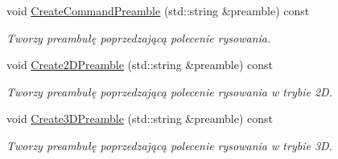 \begin{DoxyCompactItemize}
$$\item 
void \hyperlink{class_pz_g_1_1_gnuplot_link_a1d9ac939f5871ca51d283422327906ba}{Create\+Command\+Preamble} (std\+::string \&preamble) const 
\begin{DoxyCompactList}\small\item\em Tworzy preambułę poprzedzającą polecenie rysowania. \end{DoxyCompactList}\item 
void \hyperlink{class_pz_g_1_1_gnuplot_link_a540eea1303ac48055d88a57a0f7dda8f}{Create2\+D\+Preamble} (std\+::string \&preamble) const 
\begin{DoxyCompactList}\small\item\em Tworzy preambułę poprzedzającą polecenie rysowania w trybie 2D. \end{DoxyCompactList}\item 
void \hyperlink{class_pz_g_1_1_gnuplot_link_a0cfefccf9eaf44292417834525053dab}{Create3\+D\+Preamble} (std\+::string \&preamble) const 
\begin{DoxyCompactList}\small\item\em Tworzy preambułę poprzedzającą polecenie rysowania w trybie 3D. \end{DoxyCompactList}\end{DoxyCompactItemize}
